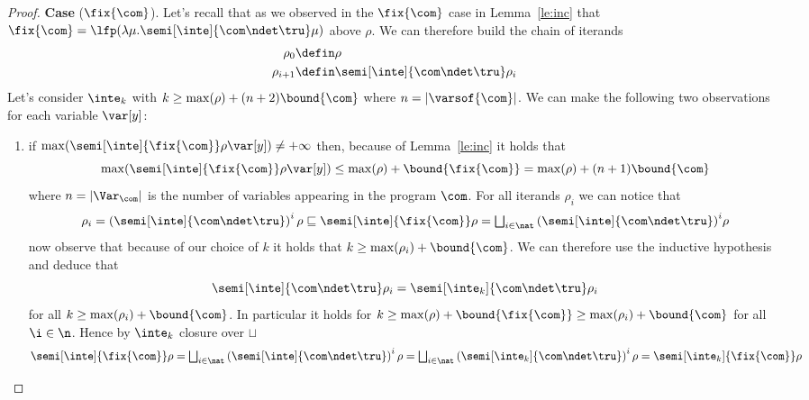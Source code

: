 \begin{proof}
  \noindent
  \textbf{Case} (\(\fix{\com}\)).
  Let's recall that as we observed in the \(\fix{\com}\) case in
  Lemma~\ref{le:inc} that
  \({\fix{\com} = \lfp(\lambda \mu . \semi[\inte]{\com \ndet
      \tru}\mu)}\) above \(\rho\). We can therefore build the chain of
  iterands
  \begin{align*}
    \rho_0 & \defin \rho \\
    \rho_{i+1} & \defin \semi[\inte]{\com \ndet \tru}\rho_i
  \end{align*}
  Let's consider \(\inte_k\) with
  \(k \geq \max(\rho) + (n+2)\bound{\com}\) where
  \(n = |\varsof{\com}|\). We can make the following two observations
  for each variable \(\var[y]\):
  \begin{enumerate}[label=(\roman*)]
  \item if
    \({\max(\semi[\inte]{\fix{\com}}\rho\var[y])} \neq +\infty\) then,
    because of Lemma~\ref{le:inc} it holds that
    \begin{equation*}
      \max(\semi[\inte]{\fix{\com}}\rho\var[y]) \leq \max(\rho) + \bound{\fix{\com}} = \max(\rho) + (n+1)\bound{\com}
    \end{equation*}
    where \(n = |\Var_{\com}|\) is the number of variables appearing
    in the program \(\com\). For all iterands \(\rho_i\) we can notice
    that
    \begin{equation*}
      \rho_i = \left(\semi[\inte]{\com \ndet \tru}\right)^i\rho \sqsubseteq \semi[\inte]{\fix{\com}}\rho = \textstyle\bigsqcup_{i\in\nat}{\left(\semi[\inte]{\com\ndet\tru}\right)}^i\rho
    \end{equation*}
    now observe that because of our choice of \(k\) it holds that
    \({k \geq \max(\rho_i) + \bound{\com}}\). We can therefore use the
    inductive hypothesis and deduce that
    \begin{equation*}
      \semi[\inte]{\com\ndet\tru}\rho_i = \semi[\inte_k]{\com\ndet\tru}\rho_i
    \end{equation*}
    for all \(k \geq \max(\rho_i) + \bound{\com}\). In particular it
    holds for
    \(k \geq \max(\rho) + \bound{\fix{\com}} \geq \max(\rho_i) +
    \bound{\com}\) for all \(\i\in\n\). Hence by \(\inte_k\) closure
    over \(\sqcup\)
    \begin{equation*}
      \semi[\inte]{\fix{\com}}\rho
      =
      \textstyle\bigsqcup_{i\in\nat}\left(\semi[\inte]{\com\ndet\tru}\right)^i\rho
      =
      \textstyle\bigsqcup_{i\in\nat}\left(\semi[\inte_k]{\com\ndet\tru}\right)^i\rho
      =
      \semi[\inte_k]{\fix{\com}}\rho
    \end{equation*}
    

\end{enumerate}
\end{proof}
